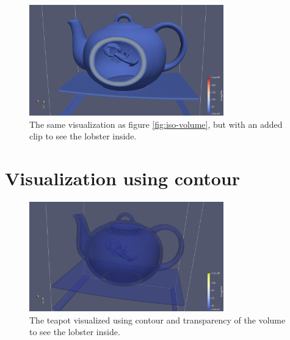 \documentclass{article}
\begin{document}
    \begin{figure}[H]
        \centering
        \includegraphics[width=0.75\textwidth]{../img/teapot-iso-volume-clip.png}
        
        \caption{The same visualization as figure \ref{fig:iso-volume}, but with an added clip to see the lobster inside.}
        \label{fig:iso-volume-clip}
    \end{figure}

    \section{Visualization using contour}


    \begin{figure}[H]
        \centering
        \includegraphics[width=0.75\textwidth]{../img/teapot-contour.png}
        
        \caption{The teapot visualized using contour and transparency of the volume to see the lobster inside.}
        \label{fig:contour}
    \end{figure}

    \newpage
\end{document}
